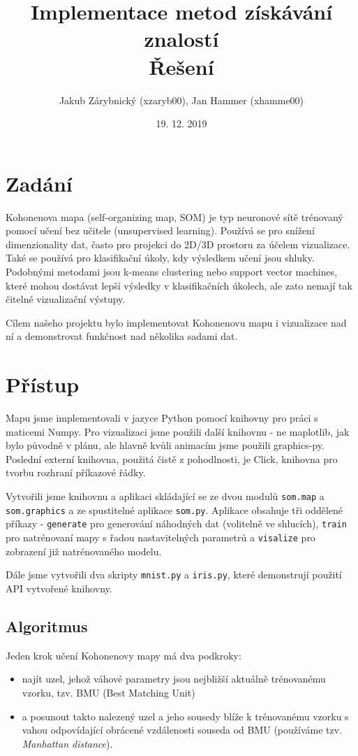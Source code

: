 \documentclass[11pt]{article}
\author{Jakub Zárybnický (xzaryb00), Jan Hammer (xhamme00)}
\date{19. 12. 2019}
\title{Implementace metod získávání znalostí\\\medskip
\large Řešení}
\begin{document}
\maketitle

\section{Zadání}
\label{sec:org7d3e019}
Kohonenova mapa (self-organizing map, SOM) je typ neuronové sítě trénovaný
pomocí učení bez učitele (unsupervised learning). Používá se pro snížení
dimenzionality dat, často pro projekci do 2D/3D prostoru za účelem
vizualizace. Také se používá pro klasifikační úkoly, kdy výsledkem učení jsou
shluky. Podobnými metodami jsou k-means clustering nebo support vector machines,
které mohou dostávat lepší výsledky v klasifikačních úkolech, ale zato nemají
tak čitelné vizualizační výstupy.

Cílem našeho projektu bylo implementovat Kohonenovu mapu i vizualizace nad ní a
demonstrovat funkčnost nad několika sadami dat.

\section{Přístup}
\label{sec:orgae4c599}
Mapu jsme implementovali v jazyce Python pomocí knihovny pro práci s maticemi
Numpy. Pro vizualizaci jsme použili další knihovnu - ne maplotlib, jak bylo
původně v plánu, ale hlavně kvůli animacím jsme použili graphics-py. Poslední
externí knihovna, použitá čistě z pohodlnosti, je Click, knihovna pro tvorbu
rozhraní příkazové řádky.

Vytvořili jsme knihovnu a aplikaci skládající se ze dvou modulů \texttt{som.map} a
\texttt{som.graphics} a ze spustitelné aplikace \texttt{som.py}. Aplikace obsahuje tři oddělené
příkazy - \texttt{generate} pro generování náhodných dat (volitelně ve shlucích), \texttt{train}
pro natrénovaní mapy s řadou nastavitelných parametrů a \texttt{visalize} pro zobrazení
již natrénovaného modelu.

Dále jsme vytvořili dva skripty \texttt{mnist.py} a \texttt{iris.py}, které demonstrují použití
API vytvořené knihovny.

\subsection{Algoritmus}
\label{sec:org812a1ea}
Jeden krok učení Kohonenovy mapy má dva podkroky:
\begin{itemize}
\item najít uzel, jehož váhové parametry jsou nejbližší aktuálně trénovanému vzorku,
tzv. BMU (Best Matching Unit)
\item a posunout takto nalezený uzel a jeho sousedy blíže k trénovanému vzorku s
vahou odpovídající obrácené vzdálenosti souseda od BMU (používáme tzv. \emph{Manhattan distance}).
\end{itemize}
\end{document}
